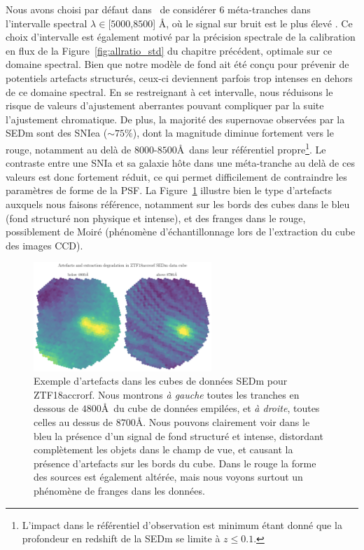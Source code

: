 \documentclass[../main/main.tex]{subfiles}
\begin{document}
Nous avons choisi par défaut dans \hypergal\ de considérer 6
méta-tranches dans l'intervalle
spectral $\lambda\in$[$5000$,$8500$] \AA, où le signal sur bruit est le
plus élevé \citep{SEDM18}. Ce choix d'intervalle est également motivé par la
précision spectrale de la calibration en flux de la
Figure~\ref{fig:allratio_std} du chapitre précédent, optimale sur ce
domaine spectral. Bien que notre
modèle de fond ait été conçu pour prévenir de potentiels artefacts
structurés, ceux-ci deviennent parfois trop intenses en dehors de ce domaine
spectral. En se restreignant à cet intervalle, nous réduisons le risque
de valeurs d'ajustement aberrantes pouvant compliquer par la suite l'ajustement
chromatique. De plus, la majorité des supernovae observées par la
SEDm sont des SNIea ($\sim75\%$), dont la magnitude diminue fortement
vers le rouge, notamment au delà
de $8000$-$8500$\AA\ dans leur référentiel propre\footnote{L'impact dans
le référentiel d'observation est minimum étant donné que la profondeur
en redshift de la SEDm se limite à $z\leq0.1$.}. Le contraste entre une SNIa et sa galaxie hôte dans une
méta-tranche au delà de ces valeurs est donc fortement réduit, ce qui
permet difficilement de contraindre les paramètres de forme de la
PSF. La Figure~\ref{fig:artefactssedmcube} illustre bien le type
d'artefacts auxquels nous faisons référence, notamment sur les bords des
cubes dans le bleu (fond structuré non physique et intense), et des franges dans le rouge, possiblement
de Moiré (phénomène d'échantillonnage lors de l'extraction du cube des
images CCD).

\begin{figure}[ht]
  \centering
  \includegraphics[width=0.6\textwidth]{../figures/07_scene/artefactssedmcube.pdf}
  \caption[Exemple d'artefacts dans les cubes de données SEDm.]{Exemple
    d'artefacts dans les cubes de données SEDm pour
    ZTF18accrorf. Nous montrons \emph{à gauche} toutes les tranches en dessous de
    $4800$\AA\ du cube de données empilées, et \emph{à droite}, toutes celles au dessus de
    $8700$\AA. Nous pouvons clairement voir dans le bleu la présence
    d'un signal de fond structuré et intense, distordant complètement les objets dans le
    champ de vue, et causant la présence d'artefacts sur les
    bords du cube. Dans le rouge la forme des sources est également
    altérée, mais nous voyons surtout un phénomène de franges dans
    les données.}
  \label{fig:artefactssedmcube}
\end{figure}
\end{document}
